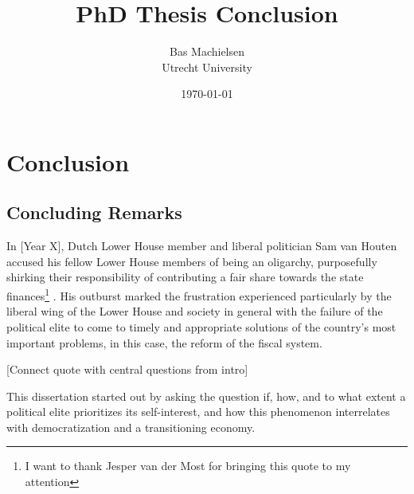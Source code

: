 

\title{\textbf{PhD Thesis Conclusion}}
\author{Bas Machielsen \\ Utrecht University}
\date{\today}



\maketitle

\section{Conclusion}

\subsection{Concluding Remarks}

In [Year X], Dutch Lower House member and liberal politician Sam van Houten accused his fellow Lower House members of being an oligarchy, purposefully shirking their responsibility of contributing a fair share towards the state finances\footnote{I want to thank Jesper van der Most for bringing this quote to my attention} \citep{van2013eerste}. His outburst marked the frustration experienced particularly by the liberal wing of the Lower House and society in general with the failure of the political elite to come to timely and appropriate solutions of the country's most important problems, in this case, the reform of the fiscal system. 


\begin{center}
    [Connect quote with central questions from intro]
\end{center}

This dissertation started out by asking the question if, how, and to what extent a political elite prioritizes its self-interest, and how this phenomenon interrelates with democratization and a transitioning economy. 




